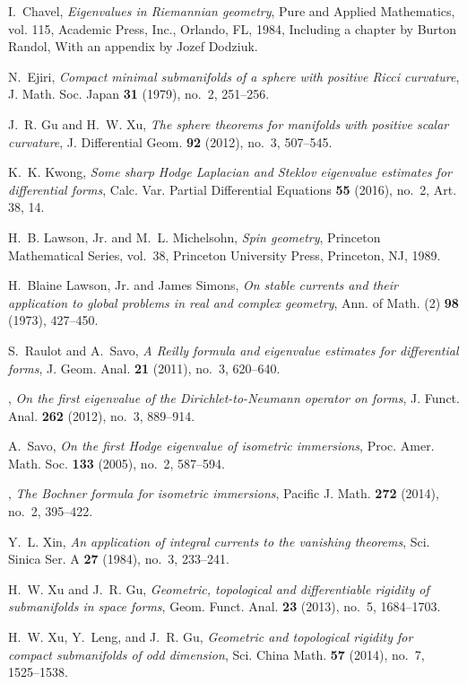 \documentclass[12pt]{amsart}
\theoremstyle{plain}
\theoremstyle{remark}
\theoremstyle{definition}
\numberwithin{equation}{section}
\begin{document}
\begin{thebibliography}{10}

I.~Chavel, \emph{Eigenvalues in {R}iemannian geometry}, Pure and Applied
  Mathematics, vol. 115, Academic Press, Inc., Orlando, FL, 1984, Including a
  chapter by Burton Randol, With an appendix by Jozef Dodziuk. 

N.~Ejiri, \emph{Compact minimal submanifolds of a sphere with positive {R}icci
  curvature}, J. Math. Soc. Japan \textbf{31} (1979), no.~2, 251--256.

J.~R. Gu and H.~W. Xu, \emph{The sphere theorems for manifolds with positive
  scalar curvature}, J. Differential Geom. \textbf{92} (2012), no.~3, 507--545.

K.~K. Kwong, \emph{Some sharp {H}odge {L}aplacian and {S}teklov eigenvalue
  estimates for differential forms}, Calc. Var. Partial Differential Equations
  \textbf{55} (2016), no.~2, Art. 38, 14. 

H.~B. Lawson, Jr. and M.~L. Michelsohn, \emph{Spin geometry}, Princeton
  Mathematical Series, vol.~38, Princeton University Press, Princeton, NJ,
  1989. 

H.~Blaine Lawson, Jr. and James Simons, \emph{On stable currents and their
  application to global problems in real and complex geometry}, Ann. of Math.
  (2) \textbf{98} (1973), 427--450. 

S.~Raulot and A.~Savo, \emph{A {R}eilly formula and eigenvalue estimates for
  differential forms}, J. Geom. Anal. \textbf{21} (2011), no.~3, 620--640.

\bysame, \emph{On the first eigenvalue of the {D}irichlet-to-{N}eumann operator
  on forms}, J. Funct. Anal. \textbf{262} (2012), no.~3, 889--914. 

A.~Savo, \emph{On the first {H}odge eigenvalue of isometric immersions}, Proc.
  Amer. Math. Soc. \textbf{133} (2005), no.~2, 587--594. 

\bysame, \emph{The {B}ochner formula for isometric immersions}, Pacific J.
  Math. \textbf{272} (2014), no.~2, 395--422. 

Y.~L. Xin, \emph{An application of integral currents to the vanishing
  theorems}, Sci. Sinica Ser. A \textbf{27} (1984), no.~3, 233--241.

H.~W. Xu and J.~R. Gu, \emph{Geometric, topological and differentiable rigidity
  of submanifolds in space forms}, Geom. Funct. Anal. \textbf{23} (2013),
  no.~5, 1684--1703. 

H.~W. Xu, Y.~Leng, and J.~R. Gu, \emph{Geometric and topological rigidity for
  compact submanifolds of odd dimension}, Sci. China Math. \textbf{57} (2014),
  no.~7, 1525--1538. 

\end{thebibliography}
\end{document}
